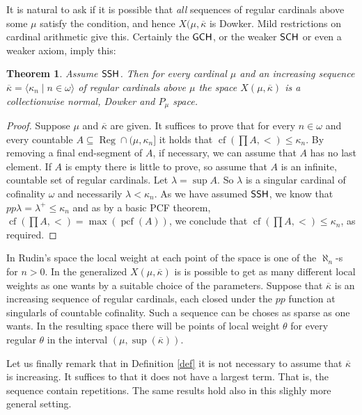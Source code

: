 \documentclass{amsart}
\newtheorem{theorem}{Theorem}[section]
\theoremstyle{remark}
\DeclareMathOperator{\ssh}{\sf SSH}
\DeclareMathOperator{\gch}{\sf GCH}
\DeclareMathOperator{\sch}{\sf SCH}
\DeclareMathOperator{\cf}{cf}
\DeclareMathOperator{\pcf}{pcf}
\DeclareMathOperator{\Reg}{Reg}
\renewcommand\mid{\mathrel{|}\allowbreak}
\begin{document}
It is natural to ask if it is possible that \emph{all} sequences of regular cardinals above some \(\mu\) satisfy the condition, and hence \(X(\mu,\overline \kappa\) is Dowker. Mild restrictions on cardinal arithmetic give this. Certainly the \(\gch\), or the weaker \(\sch\) or even a weaker axiom, imply this:
\
\begin{theorem}
Assume \(\ssh\). Then for every cardinal \(\mu\) and an increasing  sequence
\(\overline \kappa=\langle \kappa_{n}\mid n\in \omega\rangle\) of regular cardinals above \(\mu\) the space  \(X(\mu,\overline \kappa)\) is a collectionwise normal, 
Dowker and \(P_{\mu}\)  space.
\end{theorem}

\begin{proof}
  Suppose \(\mu\) and \(\overline \kappa\) are given. It suffices to prove that for every \(n\in \omega\) and every countable  \(A\subseteq\Reg\cap (\mu,\kappa_{n}]\) it holds that \(\cf(\prod A,<)\le \kappa_{n}\). By removing a final end-segment of \(A\), if necessary, we can assume that \(A\) has no last element. If \(A\) is empty there is little to prove, so assume that \(A\) is an infinite, countable set of regular cardinals. Let \(\lambda=\sup A\). So \(\lambda \) is a singular cardinal of cofinality \(\omega\) and necessarily \(\lambda<\kappa_{n}\).  As we have assumed
  \(\ssh\), we know that \(pp \lambda=\lambda^{+}\le\kappa_{n}\) and as by a basic PCF theorem, \(\cf(\prod A,<)=\max(\pcf(A))\), we conclude that \(\cf(\prod A,<)\le \kappa_{n}\), as required.
  \end{proof}

In Rudin's space the local weight at each point of the space is one of the
\(\aleph_{n}\)-s for \(n>0\). In the generalized \(X(\mu,\overline \kappa)\) is is
possible to get as many different local weights as one wants by a suitable
choice of the parameters. Suppose that \(\overline \kappa\) is an increasing sequence
of regular cardinals, each closed under the \(pp\) function at singularls of
countable cofinality. Such a sequence can be choses as sparse as one wants. In
the resulting space there will be points of local weight \(\theta\) for every
regular \(\theta\) in the interval \((\mu,\sup(\overline \kappa))\).


Let us finally remark that in Definition \ref{def} it is not necessary to 
assume that \(\overline \kappa\) is 
increasing. It suffices to that it does not have a largest term. That is, the sequence 
contain repetitions. The same results hold also in this slighly more general setting. 
\end{document}
